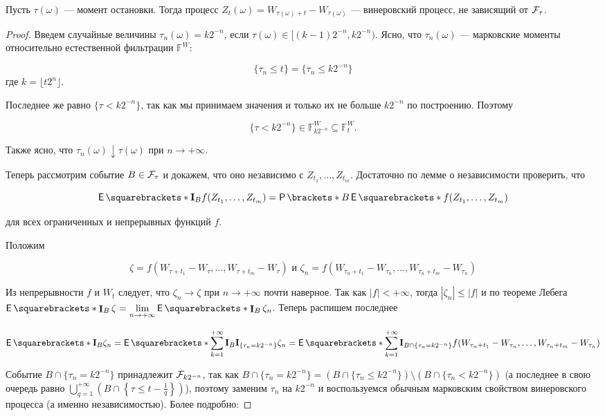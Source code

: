 \begin{theorem}
  Пусть $\tau(\omega)$ --- момент остановки. Тогда процесс $Z_t(\omega) = 
  W_{\tau(\omega) + t} - W_{\tau(\omega)}$ --- винеровский процесс, не зависящий
  от $\mathcal{F}_\tau$.
\end{theorem}

\begin{proof}
  Введем случайные величины $\tau_n(\omega) = k2^{-n}$, если $\tau(\omega) \in
  [(k - 1)2^{-n}, k2^{-n})$. Ясно, что $\tau_n(\omega)$ --- марковские
  моменты относительно естественной фильтрации $\mathbb{F}^W$:

  \[
    \{\tau_n \leq t\} = \{\tau_n \leq k2^{-n}\}
  \]
  где $k = \lfloor t2^n \rfloor$.

  Последнее же равно $\{\tau < k2^{-n}\}$, так как мы принимаем значения и только их
  не больше $k2^{-n}$ по построению. Поэтому

  \[
    \{\tau < k2^{-n}\} \in \mathbb{F}^W_{k2^{-n}} \subseteq \mathbb{F}^W_t.
  \]

  Также ясно, что $\tau_n(\omega) \downarrow \tau(\omega)$ при $n \to +\infty$.

  Теперь рассмотрим событие $B \in \mathcal{F}_\tau$ и докажем, что оно независимо с
  $Z_{t_1}, \ldots, Z_{t_m}$. Достаточно по лемме о независимости проверить, что

  \[
    \E{\mathbf{I}_B f(Z_{t_1}, \ldots, Z_{t_m})} = 
    \Pr{B}\E{f(Z_{t_1}, \ldots, Z_{t_m})}
  \]

  для всех ограниченных и непрерывных функций $f$.

  Положим 

  \[
    \zeta = f(W_{\tau + t_1} - W_\tau, \ldots, W_{\tau + t_m} - W_\tau)
    \text{ и } \zeta_n = f(W_{\tau_n + t_1} - W_{\tau_n}, \ldots, W_{\tau_n + t_m} -
     W_{\tau_n})
  \]

  Из непрерывности $f$ и $W_t$ следует, что $\zeta_n \to \zeta$ при $n \to +\infty$
  почти наверное. Так как $|f| < +\infty$, тогда $|\zeta_n| \leq |f|$ и по теореме
  Лебега
  $\E{\I_B\zeta} = \lim\limits_{n \to +\infty} \E{\I_B \zeta_n}$. Теперь распишем
  последнее

  \[
    \E{\mathbf{I}_B\zeta_n} = \E{\sum\limits_{k = 1}^{+\infty}\mathbf{I}_B
    \mathbf{I}_{\{\tau_n = k2^{-n}\}} \zeta_n} =
    \E{\sum\limits_{k = 1}^{+\infty}\mathbf{I}_{B\cap\{\tau_n = k2^{-n}\}}
    f(W_{\tau_n + t_1} - W_{\tau_n}, \ldots, W_{\tau_n + t_m} -
     W_{\tau_n})}
  \]

  Событие $B \cap \{\tau_n = k2^{-n}\}$ принадлежит $\mathcal{F}_{k2^{-n}}$, так как
  $B \cap \{\tau_n = k2^{-n}\} = (B \cap \{\tau_n \leq k2^{-n}\}) \setminus
  (B \cap \{\tau_n < k2^{-n}\})$ (а последнее в свою очередь равно $\bigcup
  \limits_{q = 1}^{+\infty}\left(B \cap \left\{\tau \leq t - \frac{1}{q}\right\}\right)$),
  поэтому заменим $\tau_n$ на $k2^{-n}$ и воспользуемся обычным марковским свойством
  винеровского процесса (а именно независимостью). Более подробно:


\end{proof}
